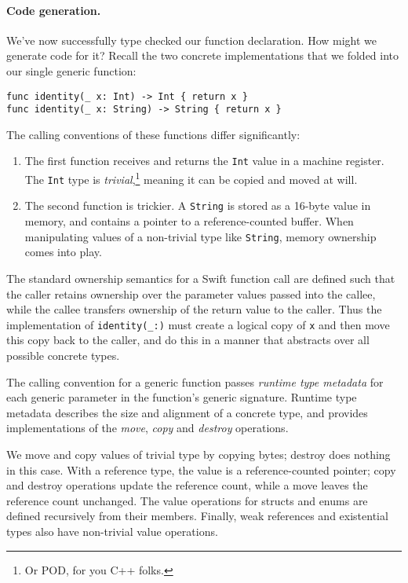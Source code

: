\documentclass[../generics]{subfiles}
\begin{document}
\paragraph{Code generation.}
We've now successfully type checked our function declaration. How might we generate code for it? Recall the two concrete implementations that we folded into our single generic function:
\begin{Verbatim}
func identity(_ x: Int) -> Int { return x }
func identity(_ x: String) -> String { return x }
\end{Verbatim}
The calling conventions of these functions differ significantly:
\begin{enumerate}
\item The first function receives and returns the \texttt{Int} value in a machine register. The \texttt{Int} type is \emph{trivial},\footnote{Or POD, for you C++ folks.} meaning it can be copied and moved at will.
\item The second function is trickier. A \texttt{String} is stored as a 16-byte value in memory, and contains a pointer to a reference-counted buffer. When manipulating values of a non-trivial type like \texttt{String}, memory ownership comes into play.
\end{enumerate}

The standard ownership semantics for a Swift function call are defined such that the caller retains ownership over the parameter values passed into the callee, while the callee transfers ownership of the return value to the caller. Thus the implementation of \verb|identity(_:)| must create a logical copy of \texttt{x} and then move this copy back to the caller, and do this in a manner that abstracts over all possible concrete types.

The calling convention for a generic function passes \emph{runtime type metadata} for each generic parameter in the function's generic signature. Runtime type metadata describes the size and alignment of a concrete type, and provides implementations of the \emph{move}, \emph{copy} and \emph{destroy} operations.

We move and copy values of trivial type by copying bytes; destroy does nothing in this case. With a reference type, the value is a reference-counted pointer; copy and destroy operations update the reference count, while a move leaves the reference count unchanged. The value operations for structs and enums are defined recursively from their members. Finally, weak references and existential types also have non-trivial value operations.
\end{document}
